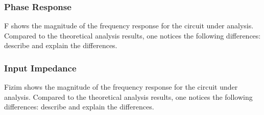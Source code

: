 \lipsum[1-1]

\subsubsection{Phase Response}

F shows the magnitude of the frequency response for the
circuit under analysis. Compared to the theoretical analysis results, one
notices the following differences: describe and explain the differences.


\lipsum[1-1]

\subsubsection{Input Impedance}

Fizim shows the magnitude of the frequency response for the
circuit under analysis. Compared to the theoretical analysis results, one
notices the following differences: describe and explain the differences.


\lipsum[1-1]



